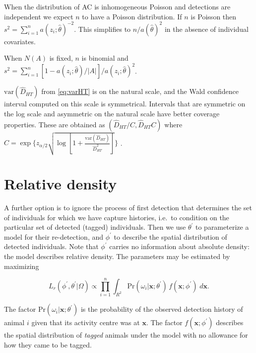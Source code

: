 \documentclass[
]{book}
\begin{document}
When the distribution of AC is inhomogeneous Poisson and detections are independent we expect \(n\) to have a Poisson distribution. If \(n\) is Poisson then \(s^2 = \sum_{i=1}^n a(z_i ; \hat \theta)^{-2}\). This simplifies to \(n/a(\hat \theta)^2\) in the absence of individual covariates.

When \(N(A)\) is fixed, \(n\) is binomial and \(s^2 = \sum_{i=1}^n [1 - a(z_i; \hat \theta)/|A|] / a(z_i; \hat \theta)^2\).

\(\mbox{var}(\hat D_{HT})\) from \eqref{eq:varHT} is on the natural scale, and the Wald confidence interval computed on this scale is symmetrical. Intervals that are symmetric on the log scale and asymmetric on the natural scale have better coverage properties. These are obtained as \((\hat D_{HT}/C, \hat D_{HT}C)\) where \(C = \exp \{ z_{\alpha/2} \sqrt{\log[1 + \frac{\mbox{var}(\hat D_{HT})}{\hat D_{HT}^2}]} \}\) \citep{Burnham1987, Chao1989}.

\section{Relative density}\label{relativedensity1}


A further option is to ignore the process of first detection that determines the set of individuals for which we have capture histories, i.e.~to condition on the particular set of detected (tagged) individuals. Then we use \(\theta^\prime\) to parameterize a model for their re-detection, and \(\phi^\prime\) to describe the spatial distribution of detected individuals. Note that \(\phi^\prime\) carries no information about absolute density: the model describes relative density. The parameters may be estimated by maximizing

\begin{equation}
L_r(\phi^\prime, \theta^\prime | \Omega) \propto \prod_{i=1}^n \int_{R^2} \mbox{Pr}(\omega_i | \mathbf{x}; \theta^\prime) \, f(\mathbf{x} ; \phi^\prime) \; d\mathbf{x}.
\end{equation}

The factor \(\mbox{Pr}(\omega_i | \mathbf{x}; \theta^\prime)\) is the probability of the observed detection history of animal \(i\) given that its activity centre was at \(\mathbf{x}\). The factor \(f(\mathbf{x} ; \phi^\prime)\) describes the spatial distribution of \emph{tagged} animals under the model with no allowance for how they came to be tagged.
\end{document}
